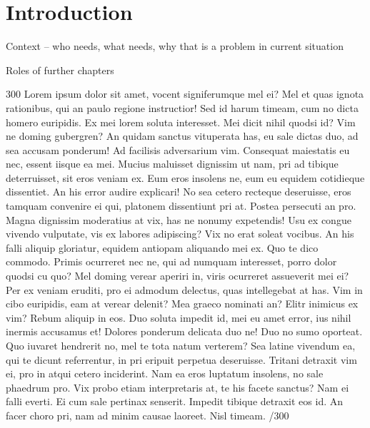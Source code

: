 \documentclass{sigchi}
\begin{document}




\section{Introduction}
Context – who needs, what needs, why that is a problem in current situation 

Roles of further chapters 

300 Lorem ipsum dolor sit amet, vocent signiferumque mel ei? Mel et quas ignota rationibus, qui an paulo regione instructior! Sed id harum timeam, cum no dicta homero euripidis. Ex mei lorem soluta interesset. Mei dicit nihil quodsi id? Vim ne doming gubergren? An quidam sanctus vituperata has, eu sale dictas duo, ad sea accusam ponderum! Ad facilisis adversarium vim. Consequat maiestatis eu nec, essent iisque ea mei. Mucius maluisset dignissim ut nam, pri ad tibique deterruisset, sit eros veniam ex. Eum eros insolens ne, eum eu equidem cotidieque dissentiet. An his error audire explicari! No sea cetero recteque deseruisse, eros tamquam convenire ei qui, platonem dissentiunt pri at. Postea persecuti an pro. Magna dignissim moderatius at vix, has ne nonumy expetendis! Usu ex congue vivendo vulputate, vis ex labores adipiscing? Vix no erat soleat vocibus. An his falli aliquip gloriatur, equidem antiopam aliquando mei ex. Quo te dico commodo. Primis ocurreret nec ne, qui ad numquam interesset, porro dolor quodsi cu quo? Mel doming verear aperiri in, viris ocurreret assueverit mei ei? Per ex veniam eruditi, pro ei admodum delectus, quas intellegebat at has. Vim in cibo euripidis, eam at verear delenit? Mea graeco nominati an? Elitr inimicus ex vim? Rebum aliquip in eos. Duo soluta impedit id, mei eu amet error, ius nihil inermis accusamus et! Dolores ponderum delicata duo ne! Duo no sumo oporteat. Quo iuvaret hendrerit no, mel te tota natum verterem? Sea latine vivendum ea, qui te dicunt referrentur, in pri eripuit perpetua deseruisse. Tritani detraxit vim ei, pro in atqui cetero inciderint. Nam ea eros luptatum insolens, no sale phaedrum pro. Vix probo etiam interpretaris at, te his facete sanctus? Nam ei falli everti. Ei cum sale pertinax senserit. Impedit tibique detraxit eos id. An facer choro pri, nam ad minim causae laoreet. Nisl timeam. /300
\end{document}
